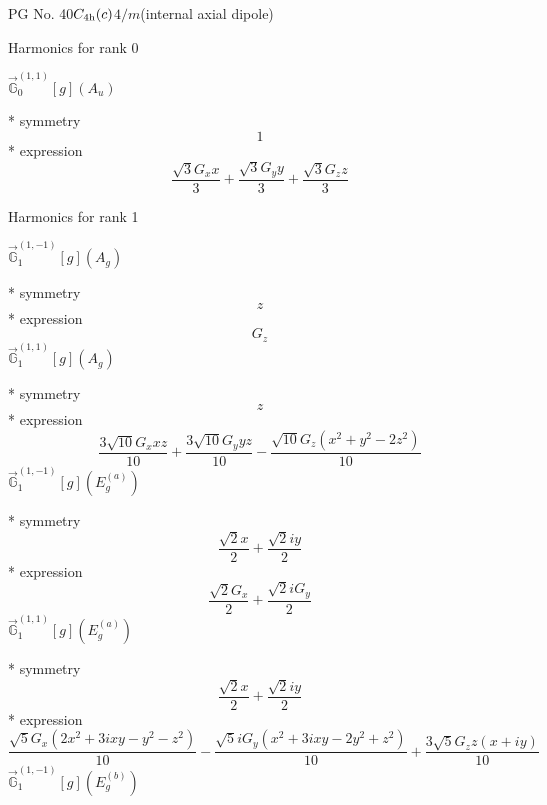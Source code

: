 \documentclass[fleqn,8pt]{jsarticle}
\begin{document}
\setcounter{MaxMatrixCols}{32}

\renewcommand{\tablename}{Table~}
\renewcommand{\figurename}{Figure~}
\begin{center}
\LARGE
PG No. 40\quad$C_{\rm 4h}(c)$\quad$4/m$\quad[ tetragonal ] (internal axial dipole)
\end{center}

\noindent * Harmonics for rank 0

\noindent\quad $\vec{\mathbb{G}}_{0}^{(1,1)}[g](A_{u})$

\noindent\quad ** symmetry
\begin{dmath*}
1
\end{dmath*}
\noindent\quad ** expression
\begin{dmath*}
\frac{\sqrt{3} G_{x} x}{3} + \frac{\sqrt{3} G_{y} y}{3} + \frac{\sqrt{3} G_{z} z}{3}
\end{dmath*}

\noindent * Harmonics for rank 1

\noindent\quad $\vec{\mathbb{G}}_{1}^{(1,-1)}[g](A_{g})$

\noindent\quad ** symmetry
\begin{dmath*}
z
\end{dmath*}
\noindent\quad ** expression
\begin{dmath*}
G_{z}
\end{dmath*}
\noindent\quad $\vec{\mathbb{G}}_{1}^{(1,1)}[g](A_{g})$

\noindent\quad ** symmetry
\begin{dmath*}
z
\end{dmath*}
\noindent\quad ** expression
\begin{dmath*}
\frac{3 \sqrt{10} G_{x} x z}{10} + \frac{3 \sqrt{10} G_{y} y z}{10} - \frac{\sqrt{10} G_{z} \left(x^{2} + y^{2} - 2 z^{2}\right)}{10}
\end{dmath*}
\noindent\quad $\vec{\mathbb{G}}_{1}^{(1,-1)}[g](E_{g}^{(a)})$

\noindent\quad ** symmetry
\begin{dmath*}
\frac{\sqrt{2} x}{2} + \frac{\sqrt{2} i y}{2}
\end{dmath*}
\noindent\quad ** expression
\begin{dmath*}
\frac{\sqrt{2} G_{x}}{2} + \frac{\sqrt{2} i G_{y}}{2}
\end{dmath*}
\noindent\quad $\vec{\mathbb{G}}_{1}^{(1,1)}[g](E_{g}^{(a)})$

\noindent\quad ** symmetry
\begin{dmath*}
\frac{\sqrt{2} x}{2} + \frac{\sqrt{2} i y}{2}
\end{dmath*}
\noindent\quad ** expression
\begin{dmath*}
\frac{\sqrt{5} G_{x} \left(2 x^{2} + 3 i x y - y^{2} - z^{2}\right)}{10} - \frac{\sqrt{5} i G_{y} \left(x^{2} + 3 i x y - 2 y^{2} + z^{2}\right)}{10} + \frac{3 \sqrt{5} G_{z} z \left(x + i y\right)}{10}
\end{dmath*}
\noindent\quad $\vec{\mathbb{G}}_{1}^{(1,-1)}[g](E_{g}^{(b)})$
\end{document}
